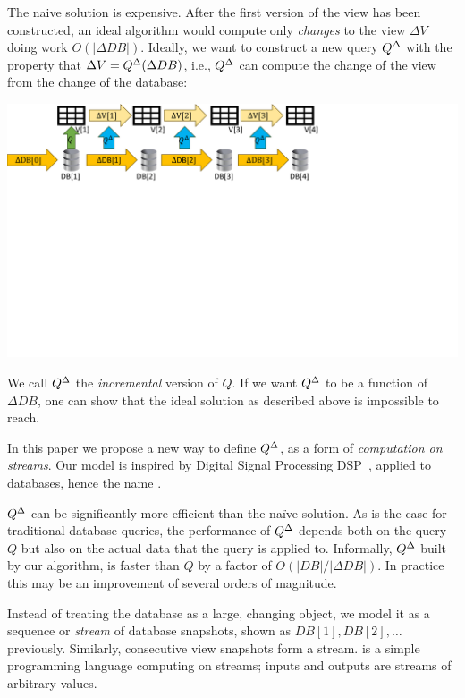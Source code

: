 The naive solution is expensive.  After the first version of the view
has been constructed, an ideal algorithm would compute only
\emph{changes} to the view $\Delta V$ doing work $O(|\Delta DB|)$.
Ideally, we want to construct a new query ${Q}^{\Delta}$ with the property
that $\Delta V = {Q}^{\Delta}(\Delta DB)$, i.e., ${Q}^{\Delta}$ can compute the
change of the view from the change of the database:

\noindent \includegraphics[trim={0 5.2in 4.1in 0},clip,scale=.35]{incview.pdf}

We call ${Q}^{\Delta}$ the \emph{incremental} version of $Q$.  If we want
${Q}^{\Delta}$ to be a function of $\Delta DB$, one can show that the ideal
solution as described above is impossible to reach.

In this paper we propose a new way to define ${Q}^{\Delta}$, as a form of
\emph{computation on streams}.  Our model is inspired by Digital
Signal Processing DSP~\cite{rabiner-book75}, applied to databases,
hence the name \dbsp.

${Q}^{\Delta}$ can be significantly more efficient than the na\"ive
solution.  As is the case for traditional database queries, the
performance of ${Q}^{\Delta}$ depends both on the query $Q$ but also on the
actual data that the query is applied to.  Informally, ${Q}^{\Delta}$ built
by our algorithm, is faster than $Q$ by a factor of $O(|DB| / |\Delta
DB|)$.  In practice this may be an improvement of several orders of
magnitude.

Instead of treating the database as a large, changing object, we model
it as a sequence or \emph{stream} of database snapshots, shown as
$DB[1], DB[2], \ldots$ previously.  Similarly, consecutive view
snapshots form a stream.  \dbsp is a simple programming language
computing on streams; inputs and outputs are streams of arbitrary
values.

